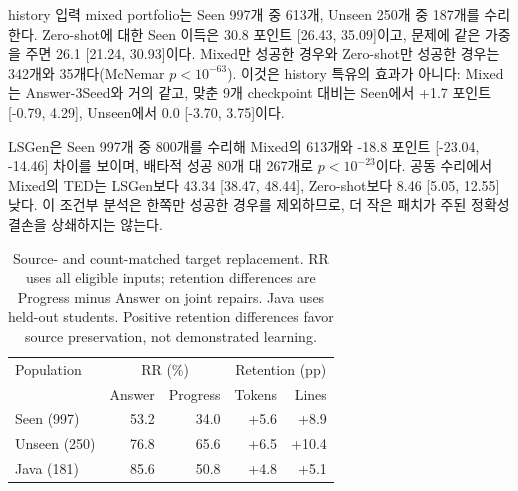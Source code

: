 \documentclass[10pt,conference]{IEEEtran}
\begin{document}
history 입력 mixed portfolio는 Seen 997개 중 613개, Unseen 250개 중 187개를 수리한다. Zero-shot에 대한 Seen 이득은 30.8 포인트 [26.43, 35.09]이고, 문제에 같은 가중을 주면 26.1 [21.24, 30.93]이다. Mixed만 성공한 경우와 Zero-shot만 성공한 경우는 342개와 35개다(McNemar \(p<10^{-63}\)). 이것은 history 특유의 효과가 아니다: Mixed는 Answer-3Seed와 거의 같고, 맞춘 9개 checkpoint 대비는 Seen에서 +1.7 포인트 [-0.79, 4.29], Unseen에서 0.0 [-3.70, 3.75]이다.

LSGen은 Seen 997개 중 800개를 수리해 Mixed의 613개와 -18.8 포인트 [-23.04, -14.46] 차이를 보이며, 배타적 성공 80개 대 267개로 \(p<10^{-23}\)이다. 공동 수리에서 Mixed의 TED는 LSGen보다 43.34 [38.47, 48.44], Zero-shot보다 8.46 [5.05, 12.55] 낮다. 이 조건부 분석은 한쪽만 성공한 경우를 제외하므로, 더 작은 패치가 주된 정확성 결손을 상쇄하지는 않는다.

\begin{table}[h]
\caption{Source- and count-matched target replacement. RR uses all eligible inputs; retention differences are Progress minus Answer on joint repairs. Java uses held-out students. Positive retention differences favor source preservation, not demonstrated learning.}
\label{tab:targets}
\centering\small
\begin{tabular}{l||rr|rr}
\toprule
Population & \multicolumn{2}{c|}{RR (\%)} & \multicolumn{2}{c}{Retention (pp)} \\
 & Answer & Progress & Tokens & Lines \\
\midrule
Seen (997) & 53.2 & 34.0 & +5.6 & +8.9 \\
Unseen (250) & 76.8 & 65.6 & +6.5 & +10.4 \\
Java (181) & 85.6 & 50.8 & +4.8 & +5.1 \\
\bottomrule
\end{tabular}
\end{table}
\end{document}
